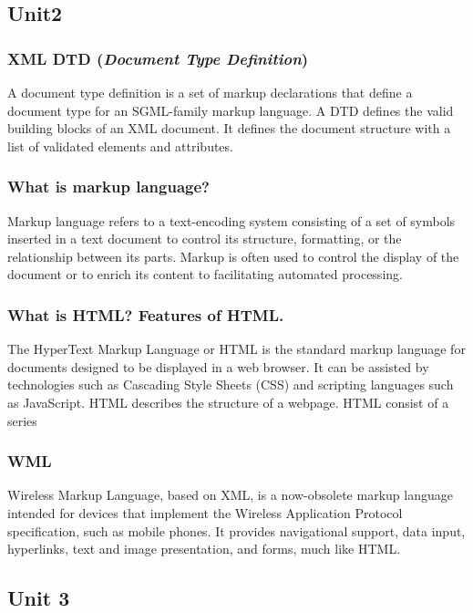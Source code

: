 \documentclass[twocolumn, a4paper]{article}
\begin{document}
\newpage
\begin{tcolorbox}
  \part{Unit2}
\end{tcolorbox}
\section{XML DTD (\emph{Document Type Definition})}
A document type definition is a set of markup declarations that define a
document type for an SGML-family markup language. A DTD defines the valid
building blocks of an XML document. It defines the document structure with a
list of validated elements and attributes.

\section{What is markup language?}
Markup language refers to a text-encoding system consisting of a set of
symbols inserted in a text document to control its structure, formatting, or
the relationship between its parts. Markup is often used to control the
display of the document or to enrich its content to facilitating automated
processing.

\section{What is HTML? Features of HTML.}
The HyperText Markup Language or HTML is the standard markup language for
documents designed to be displayed in a web browser. It can be assisted by
technologies such as Cascading Style Sheets (CSS) and scripting languages such
as JavaScript. HTML describes the structure of a webpage. HTML consist of a
series


\section{WML}
Wireless Markup Language, based on XML, is a now-obsolete markup language
intended for devices that implement the Wireless Application Protocol
specification, such as mobile phones. It provides navigational support, data
input, hyperlinks, text and image presentation, and forms, much like HTML.

\newpage
\begin{tcolorbox}
  \part{Unit 3}
\end{tcolorbox}
\end{document}
